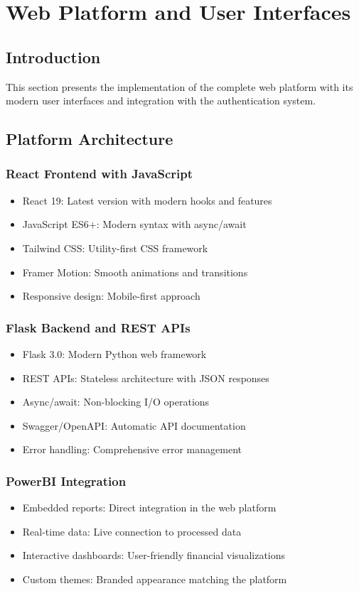 \section{Web Platform and User Interfaces}

\subsection{Introduction}
This section presents the implementation of the complete web platform with its modern user interfaces and integration with the authentication system.

\subsection{Platform Architecture}
\subsubsection{React Frontend with JavaScript}
\begin{itemize}
    \item React 19: Latest version with modern hooks and features
    \item JavaScript ES6+: Modern syntax with async/await
    \item Tailwind CSS: Utility-first CSS framework
    \item Framer Motion: Smooth animations and transitions
    \item Responsive design: Mobile-first approach
\end{itemize}

\subsubsection{Flask Backend and REST APIs}
\begin{itemize}
    \item Flask 3.0: Modern Python web framework
    \item REST APIs: Stateless architecture with JSON responses
    \item Async/await: Non-blocking I/O operations
    \item Swagger/OpenAPI: Automatic API documentation
    \item Error handling: Comprehensive error management
\end{itemize}

\subsubsection{PowerBI Integration}
\begin{itemize}
    \item Embedded reports: Direct integration in the web platform
    \item Real-time data: Live connection to processed data
    \item Interactive dashboards: User-friendly financial visualizations
    \item Custom themes: Branded appearance matching the platform
\end{itemize}

